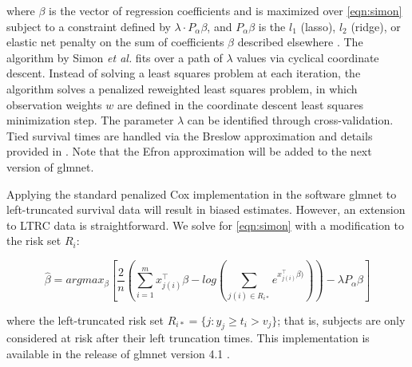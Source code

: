\documentclass[11pt,final,fleqn]{article}\usepackage[]{graphicx}\usepackage[]{color}
\theoremstyle{plain}
\newcommand{\pkg}[1]{{\fontseries{b}\selectfont #1}}
\begin{document}
where $\beta$ is the vector of regression coefficients and is maximized over \autoref{eqn:simon} subject to a constraint defined by $\lambda \cdot P_{\alpha}\beta$, and $P_{\alpha}\beta$ is the $l_1$ (lasso), $l_2$ (ridge), or elastic net penalty on the sum of coefficients $\beta$ described elsewhere \cite{simon2011regularization, tibshirani1996regression, tikhonov1963ridge, zou2005regularization}. The algorithm by Simon \emph{et al.} fits over a path of $\lambda$ values via cyclical coordinate descent. Instead of solving a least squares problem at each iteration, the algorithm solves a penalized reweighted least squares problem, in which observation weights $w$ are defined in the coordinate descent least squares minimization step. The parameter $\lambda$ can be identified through cross-validation. Tied survival times are handled via the Breslow approximation \cite{breslow1972} and details provided in \cite{simon2011regularization}. Note that the Efron approximation will be added to the next version of \pkg{glmnet}.

Applying the standard penalized Cox implementation in the software \pkg{glmnet} to left-truncated survival data will result in biased estimates. However, an extension to LTRC data is straightforward. We solve for \autoref{eqn:simon} with a modification to the risk set $R_i$:

\begin{equation}
\hat{\beta} = argmax_{\beta}  \left[ \frac{2}{n} \left( \sum_{i=1}^m x_{j(i)}^\intercal\beta - log\left(\sum_{j(i)\in R_{i\ast}}  e^{x_{j(i)}^\intercal\beta)}\right) \right)  - \lambda P_{\alpha}\beta  \right] 
\end{equation}

where the left-truncated risk set $R_{i\ast} = \{ j : y_j \geq t_i > v_j \}$; that is, subjects are only considered at risk after their left truncation times. This implementation is available in the release of \pkg{glmnet} version 4.1 \cite{glmnet}.
\end{document}

